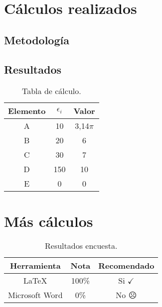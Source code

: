 \newpage
\begin{anexo}
	\section{Cálculos realizados}

		\subsection{Metodología}
			\lipsum[1]


		\subsection{Resultados}
			\lipsum[10]

			\enabletablerowcolor[2] %
			\begin{table}[htbp]
				\centering
				\caption{Tabla de cálculo.}
				\begin{tabular}{ccc}
					\hline
					\textbf{Elemento} & $\epsilon_i$ & \boldmath{}\textbf{Valor}\unboldmath{} \bigstrut\\
					\hline
					A     & 10    & 3,14$\pi$ \bigstrut[t]\\
					B     & 20    & 6 \\
					C     & 30    & 7 \\
					D     & 150    & 10 \\
					E     & 0    & 0 \\
					\hline
					\end{tabular}
				\label{tab:anexo-1}
			\end{table}
			\disabletablerowcolor %

	\newpage
	\section{Más cálculos}

		\lipsum[1]

		\newp \lipsum[4]

		\begin{table}[htbp]
			\centering
			\caption{Resultados encuesta.}
			\begin{tabular}{ccc}
				\hline
				\textbf{Herramienta} & \textbf{Nota} & \textbf{Recomendado} \bigstrut\\
				\hline
				\LaTeX & 100\% & Si $\checkmark$ \\
				Microsoft Word \textsuperscript{\textregistered} & 0\% & No $\frownie$\\
				\hline
			\end{tabular}
			\label{tab:anexo-2}
		\end{table}

\end{anexo}